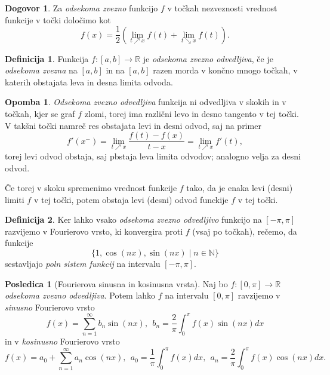 \documentclass[11pt]{article}
\theoremstyle{definition}
\newtheorem{definicija}{Definicija}[section]
\theoremstyle{definition}
\theoremstyle{definition}
\theoremstyle{theorem}
\newtheorem*{posledica}{Posledica}
\newtheorem*{dogovor}{Dogovor}
\newtheorem*{opomba}{Opomba}
\begin{document}
\begin{dogovor}

Za \textit{odsekoma zvezno} funkcijo $f$ v točkah nezveznosti vrednost funkcije v točki določimo kot
$$f(x) = \frac{1}{2} \left( \lim_{t \nearrow x} f(t) + \lim_{t \searrow x} f(t) \right).$$

\end{dogovor}
\vspace{0.5cm}

\begin{definicija}

Funkcija $f:[a, b] \rightarrow \mathbb{R}$ je \textit{odsekoma zvezno odvedljiva}, če je \textit{odsekoma zvezna} na $[a, b]$ in  na $[a, b]$ razen morda v končno mnogo točkah, v katerih obstajata leva in desna limita odvoda.

\end{definicija}
\vspace{0.5cm}

\begin{opomba}

\textit{Odsekoma zvezno odvedljiva} funkcija ni odvedljiva v skokih in v točkah, kjer se graf $f$ zlomi, torej ima različni levo in desno tangento v tej točki. V takšni točki namreč res obstajata levi in desni odvod, saj na primer 
$$f'(x^-) = \lim_{t \nearrow x} \frac{f(t) - f(x)}{t-x} = \lim_{t \nearrow x} f'(t),$$
torej levi odvod obstaja, saj pbstaja leva limita odvodov; analogno velja za desni odvod.

Če torej v skoku spremenimo vrednost funkcije $f$ tako, da je enaka levi (desni) limiti $f$ v tej točki, potem obstaja levi (desni) odvod funckije $f$ v tej točki.

\end{opomba}
\vspace{0.5cm}

\begin{definicija}

Ker lahko vsako \textit{odsekoma zvezno odvedljivo} funkcijo na $[-\pi, \pi]$ razvijemo v Fourierovo vrsto, ki konvergira proti $f$ (vsaj po točkah), rečemo, da funkcije 
$$ \{ 1, \cos(nx), \sin(nx) \mid n \in \mathbb{N} \}$$
sestavljajo \textit{poln sistem funkcij} na intervalu $[-\pi, \pi]$.

\end{definicija}
\vspace{0.5cm}

\begin{posledica}[Fourierova sinusna in kosinusna vrsta]

Naj bo $f:[0, \pi] \rightarrow \mathbb{R}$ \textit{odsekoma zvezno odvedljiva}. Potem lahko $f$ na intervalu $[0, \pi]$ ravzijemo v \textit{sinusno} Fourierovo vrsto
$$f(x) = \sum_{n=1}^{\infty} b_n \sin(nx), ~~b_n = \frac{2}{\pi} \int_{0}^{\pi} f(x) \sin(nx) dx$$
in v \textit{kosinusno} Fourierovo vrsto
$$f(x) = a_0 + \sum_{n=1}^{\infty} a_n \cos(nx), ~~a_0 = \frac{1}{\pi} \int_{0}^{\pi} f(x) dx, ~~a_n = \frac{2}{\pi} \int_{0}^{\pi} f(x) \cos(nx) dx.$$

\end{posledica}
\vspace{0.5cm}
\end{document}
